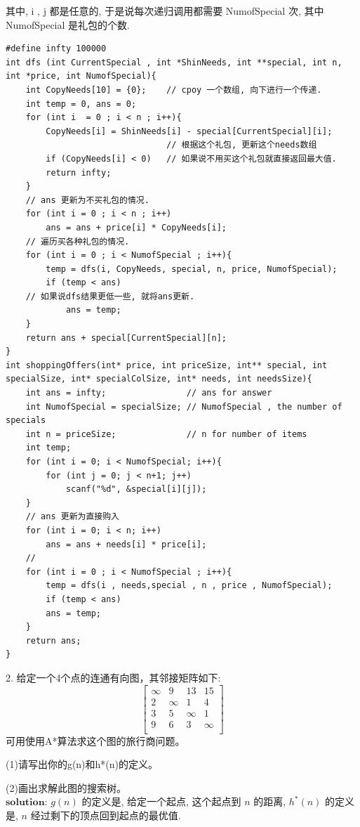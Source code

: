\documentclass[a4paper, 10pt]{ctexart} %
\begin{document}
其中, i , j 都是任意的, 于是说每次递归调用都需要 Numof{}Special 次, 其中 Numof{}Special 是礼包的个数. 


\begin{verbatim}
#define infty 100000
int dfs (int CurrentSpecial , int *ShinNeeds, int **special, int n, int *price, int NumofSpecial){
    int CopyNeeds[10] = {0};    // cpoy 一个数组, 向下进行一个传递. 
    int temp = 0, ans = 0;
    for (int i  = 0 ; i < n ; i++){
        CopyNeeds[i] = ShinNeeds[i] - special[CurrentSpecial][i];
                                // 根据这个礼包, 更新这个needs数组
        if (CopyNeeds[i] < 0)   // 如果说不用买这个礼包就直接返回最大值. 
        return infty;
    }
    // ans 更新为不买礼包的情况. 
    for (int i = 0 ; i < n ; i++)
        ans = ans + price[i] * CopyNeeds[i];
    // 遍历买各种礼包的情况.
    for (int i = 0 ; i < NumofSpecial ; i++){
        temp = dfs(i, CopyNeeds, special, n, price, NumofSpecial);
        if (temp < ans)
    // 如果说dfs结果更低一些, 就将ans更新.
            ans = temp;
    }
    return ans + special[CurrentSpecial][n];
}
int shoppingOffers(int* price, int priceSize, int** special, int specialSize, int* specialColSize, int* needs, int needsSize){
    int ans = infty;                // ans for answer
    int NumofSpecial = specialSize; // NumofSpecial , the number of specials
    int n = priceSize;              // n for number of items
    int temp; 
    for (int i = 0; i < NumofSpecial; i++){
        for (int j = 0; j < n+1; j++)
            scanf("%d", &special[i][j]);
    }
    // ans 更新为直接购入
    for (int i = 0; i < n; i++)
        ans = ans + needs[i] * price[i];
    // 
    for (int i = 0 ; i < NumofSpecial ; i++){
        temp = dfs(i , needs,special , n , price , NumofSpecial);
        if (temp < ans)
        ans = temp;
    }
    return ans;
}
\end{verbatim}

2. 给定一个4个点的连通有向图，其邻接矩阵如下:
\[\left[
\begin{matrix}
    \infty & 9 & 13 & 15 \\ 
    2 & \infty & 1 & 4 \\ 
    3 & 5 & \infty & 1 \\ 
    9 & 6 & 3 & \infty \\ 
\end{matrix}
\right]
\]
可用使用A*算法求这个图的旅行商问题。

(1)请写出你的g(n)和h*(n)的定义。

(2)画出求解此图的搜索树。
\\[7pt]
$\mathbf{solution}$: $g\left(n\right)$ 的定义是, 给定一个起点, 这个起点到 $n$ 的距离, $h^{*}\left(n\right)$ 的定义是, $n$ 经过剩下的顶点回到起点的最优值. 
\end{document}
